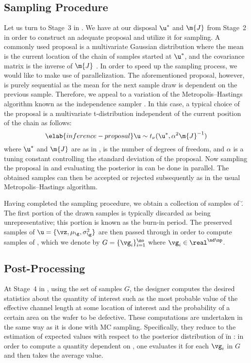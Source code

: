 \subsection{Sampling Procedure}

Let us turn to Stage~3 in . We have at our disposal
$\u^*$ and $\m{J}$ from Stage~2 in order to construct an adequate proposal and
utilize it for sampling. A commonly used proposal is a multivariate Gaussian
distribution where the mean is the current location of the chain of samples
started at $\u^*$, and the covariance matrix is the inverse of $\m{J}$
\cite{gelman2013}. In order to speed up the sampling process, we would like to
make use of parallelization. The aforementioned proposal, however, is purely
sequential as the mean for the next sample draw is dependent on the previous
sample. Therefore, we appeal to a variation of the Metropolis--Hastings
algorithm known as the independence sampler \cite{gelman2013}. In this case, a
typical choice of the proposal is a multivariate t-distribution independent of
the current position of the chain as follows:
\begin{equation} \elab{inference-proposal}
  \u \sim t_\nu(\u^*, \alpha^2 \m{J}^{-1})
\end{equation}
where $\u^*$ and $\m{J}$ are as in , \nu is the
number of degrees of freedom, and $\alpha$ is a tuning constant controlling the
standard deviation of the proposal. Now sampling the proposal in
 and evaluating the posterior in
 can be done in parallel. The obtained samples can
then be accepted or rejected subsequently as in the usual Metropolis--Hastings
algorithm.

Having completed the sampling procedure, we obtain a collection of samples of
\u. The first portion of the drawn samples is typically discarded as being
unrepresentative; this portion is known as the burn-in period. The preserved
samples of $\u = \{ \vz, \mu_\g, \sigma^2_\g \}$ are then passed through
 in order to compute samples of \g, which we denote by
$G = \{ \vg_i \}_{i = 1}^\no$ where $\vg_i \in \real^{\nd \np}$.

\subsection{Post-Processing}

At Stage~4 in , using the set of samples $G$, the
designer computes the desired statistics about the quantity of interest such as
the most probable value of the effective channel length at some location of
interest and the probability of a certain area on the wafer to be defective.
These computations are undertaken in the same way as it is done with \ac{MC}
sampling. Specifically, they reduce to the estimation of expected values with
respect to the posterior distribution of \u in : in
order to compute a quantity dependent on \g, one evaluates it for each $\vg_i$
in $G$ and then takes the average value.

